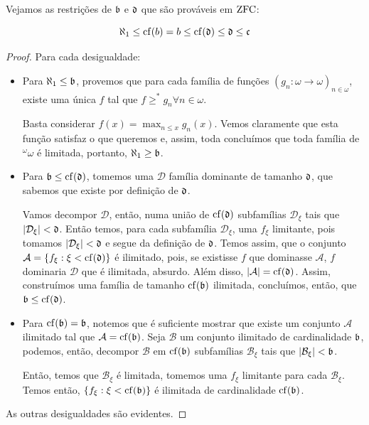 Vejamos as restrições de $\mathfrak{b}$ e $\mathfrak{d}$ que são prováveis em $\operatorname{ZFC}$:

\begin{theorem}
    $$\aleph_1 \leq \operatorname{cf}(b) = b \leq \operatorname{cf}(\mathfrak{d}) \leq \mathfrak{d} \leq \mathfrak{c}$$
\end{theorem}
\begin{proof}
    Para cada desigualdade:
    \begin{itemize}
        \item Para $\aleph_1 \leq \mathfrak{b}$, provemos que para cada família de funções $(g_n : \omega \to \omega)_{n\in \omega}$, existe uma única $f$ tal que $f\geq^* g_n \forall n\in \omega$. 
        
        Basta considerar $f(x) = \max_{n\leq x}g_n(x)$. Vemos claramente que esta função satisfaz o que queremos e, assim, toda concluímos que toda família de $^\omega\omega$ é limitada, portanto, $\aleph_1 \geq \mathfrak{b}$. 
        \item Para $\mathfrak{b} \leq \operatorname{cf}(\mathfrak{d})$, tomemos uma $\mathcal D$ família dominante de tamanho $\mathfrak{d}$, que sabemos que existe por definição de $\mathfrak{d}$. 
        
        Vamos decompor $\mathcal D$, então, numa união de $\operatorname{cf}(\mathfrak{d})$ subfamílias $\mathcal D_\xi$ tais que $|\mathcal D_\xi| < \mathfrak{d}$. Então temos, para cada subfamília $\mathcal D_\xi$, uma $f_\xi$ limitante, pois tomamos $|\mathcal D_\xi| < \mathfrak{d}$ e segue da definição de $\mathfrak{d}$. Temos assim, que o conjunto $\mathcal A = \left\{ f_\xi : \xi < \operatorname{cf}(\mathfrak{d}) \right\}$ é ilimitado, pois, se existisse $f$ que dominasse $\mathcal A$, $f$ dominaria $\mathcal D$ que é ilimitada, absurdo. Além disso, $|\mathcal A| = \operatorname{cf}(\mathfrak{d})$. Assim, construímos uma família de tamanho $\operatorname{cf}(\mathfrak{b})$ ilimitada, concluímos, então, que $\mathfrak{b} \leq \operatorname{cf}(\mathfrak{d})$. 
        \pending
        \item Para $\operatorname{cf}(\mathfrak{b}) = \mathfrak{b}$, notemos que é suficiente mostrar que existe um conjunto $\mathcal A$ ilimitado tal que $\mathcal A = \operatorname{cf}(\mathfrak{b})$. Seja $\mathcal B$ um conjunto ilimitado de cardinalidade $\mathfrak{b}$, podemos, então, decompor $\mathcal B$ em $\operatorname{cf}(\mathfrak{b})$ subfamílias $\mathcal B_\xi$ tais que $|\mathcal B_\xi| < \mathfrak{b}$. 
        
        Então, temos que $\mathcal B_\xi$ é limitada, tomemos uma $f_\xi$ limitante para cada $\mathcal B_\xi$. Temos então, $\left\{ f_\xi: \xi < \operatorname{cf}(\mathfrak{b}) \right\}$ é ilimitada de cardinalidade $\operatorname{cf}(\mathfrak{b})$.
    \end{itemize}

    As outras desigualdades são evidentes.
\end{proof}

